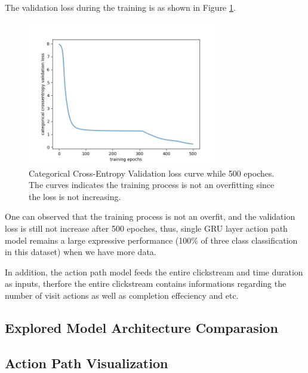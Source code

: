 The validation loss during the training is as shown in Figure \ref{fig:class-loss}.

\begin{figure}[H]
    \centering
    \includegraphics[width=0.75\textwidth]{figures/class-loss}
    \caption{Categorical Cross-Entropy Validation loss curve while 500 epoches. The curves indicates the training process
    is not an overfitting since the loss is not increasing.}
    \label{fig:class-loss}
\end{figure}

One can observed that the training process is not an overfit, and the validation loss is 
still not increase after 500 epoches, thus, single GRU layer action path model 
remains a large expressive performance (100\% of three class classification in this dataset) 
when we have more data.

In addition, the action path model feeds the entire clickstream and time duration as inputs, 
therfore the entire clickstream contains informations regarding the number of visit actions
as well as completion effeciency and etc.

\subsection{Explored Model Architecture Comparasion}

\subsection{Action Path Visualization}

\cleardoublepage